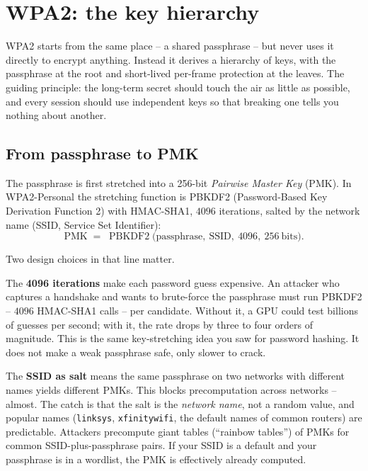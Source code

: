 \section{WPA2: the key hierarchy}

WPA2 starts from the same place -- a shared passphrase -- but never uses it
directly to encrypt anything. Instead it derives a hierarchy of keys, with the
passphrase at the root and short-lived per-frame protection at the leaves. The
guiding principle: the long-term secret should touch the air as little as
possible, and every session should use independent keys so that breaking one
tells you nothing about another.

\subsection{From passphrase to PMK}

The passphrase is first stretched into a 256-bit \emph{Pairwise Master Key}
(PMK). In WPA2-Personal the stretching function is PBKDF2 (Password-Based Key
Derivation Function 2) with HMAC-SHA1, $4096$ iterations, salted by the network
name (SSID, Service Set Identifier):
\[
  \text{PMK} \;=\; \operatorname{PBKDF2}\bigl(\text{passphrase},\ \text{SSID},\
  4096,\ 256\ \text{bits}\bigr).
\]

\begin{whybox}
Two design choices in that line matter.

The \textbf{4096 iterations} make each password guess expensive. An attacker who
captures a handshake and wants to brute-force the passphrase must run PBKDF2 --
$4096$ HMAC-SHA1 calls -- per candidate. Without it, a GPU could test billions of
guesses per second; with it, the rate drops by three to four orders of magnitude.
This is the same key-stretching idea you saw for password hashing. It does not
make a weak passphrase safe, only slower to crack.

The \textbf{SSID as salt} means the same passphrase on two networks with
different names yields different PMKs. This blocks precomputation across networks
-- almost. The catch is that the salt is the \emph{network name}, not a random
value, and popular names (\texttt{linksys}, \texttt{xfinitywifi}, the default
names of common routers) are predictable. Attackers precompute giant tables
(``rainbow tables'') of PMKs for common SSID-plus-passphrase pairs. If your SSID
is a default and your passphrase is in a wordlist, the PMK is effectively
already computed.
\end{whybox}

